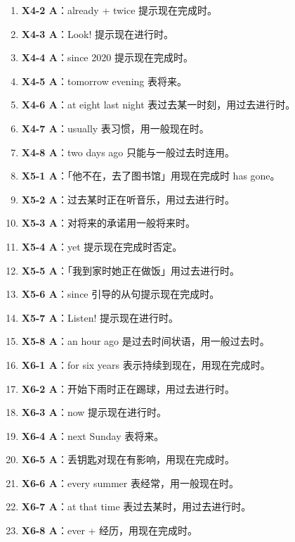 \documentclass[11pt,a4paper]{ctexart}
\begin{document}
\begin{enumerate}[leftmargin=1.6em,itemsep=2pt]
\item \textbf{X4-2 A}：already + twice 提示现在完成时。
\item \textbf{X4-3 A}：Look! 提示现在进行时。
\item \textbf{X4-4 A}：since 2020 提示现在完成时。
\item \textbf{X4-5 A}：tomorrow evening 表将来。
\item \textbf{X4-6 A}：at eight last night 表过去某一时刻，用过去进行时。
\item \textbf{X4-7 A}：usually 表习惯，用一般现在时。
\item \textbf{X4-8 A}：two days ago 只能与一般过去时连用。
\item \textbf{X5-1 A}：「他不在，去了图书馆」用现在完成时 has gone。
\item \textbf{X5-2 A}：过去某时正在听音乐，用过去进行时。
\item \textbf{X5-3 A}：对将来的承诺用一般将来时。
\item \textbf{X5-4 A}：yet 提示现在完成时否定。
\item \textbf{X5-5 A}：「我到家时她正在做饭」用过去进行时。
\item \textbf{X5-6 A}：since 引导的从句提示现在完成时。
\item \textbf{X5-7 A}：Listen! 提示现在进行时。
\item \textbf{X5-8 A}：an hour ago 是过去时间状语，用一般过去时。
\item \textbf{X6-1 A}：for six years 表示持续到现在，用现在完成时。
\item \textbf{X6-2 A}：开始下雨时正在踢球，用过去进行时。
\item \textbf{X6-3 A}：now 提示现在进行时。
\item \textbf{X6-4 A}：next Sunday 表将来。
\item \textbf{X6-5 A}：丢钥匙对现在有影响，用现在完成时。
\item \textbf{X6-6 A}：every summer 表经常，用一般现在时。
\item \textbf{X6-7 A}：at that time 表过去某时，用过去进行时。
\item \textbf{X6-8 A}：ever + 经历，用现在完成时。
\end{enumerate}
\end{document}
